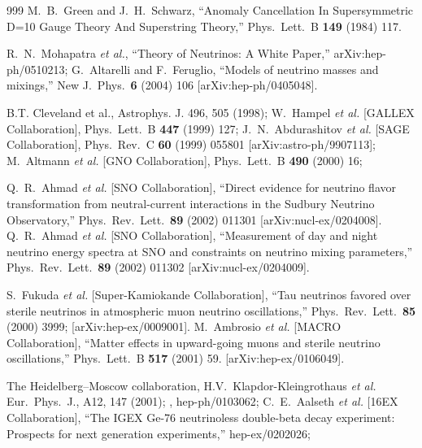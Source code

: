 \begin{thebibliography}{999}
  M.~B.~Green and J.~H.~Schwarz,
  ``Anomaly Cancellation In Supersymmetric D=10 Gauge Theory And Superstring
  Theory,''
  Phys.\ Lett.\ B {\bf 149} (1984) 117.

R.~N.~Mohapatra {\it et al.},
  ``Theory of Neutrinos: A White Paper,''
  arXiv:hep-ph/0510213;
G.~Altarelli and F.~Feruglio,
  ``Models of neutrino masses and mixings,''
  New J.\ Phys.\  {\bf 6} (2004) 106
  [arXiv:hep-ph/0405048].

B.T. Cleveland et al., Astrophys. J. 496, 505 (1998);
W.~Hampel {\it et al.}  [GALLEX Collaboration],
  Phys.\ Lett.\ B {\bf 447} (1999) 127;
J.~N.~Abdurashitov {\it et al.}  [SAGE Collaboration],
  Phys.\ Rev.\ C {\bf 60} (1999) 055801
  [arXiv:astro-ph/9907113];
M.~Altmann {\it et al.}  [GNO Collaboration],
  Phys.\ Lett.\ B {\bf 490} (2000) 16;

Q.~R.~Ahmad {\it et al.}  [SNO Collaboration],
``Direct evidence for neutrino flavor transformation from neutral-current
interactions in the Sudbury Neutrino Observatory,''
Phys.\ Rev.\ Lett.\  {\bf 89} (2002) 011301
[arXiv:nucl-ex/0204008].
Q.~R.~Ahmad {\it et al.}  [SNO Collaboration],
``Measurement of day and night neutrino energy spectra at SNO and constraints
on neutrino mixing parameters,''
Phys.\ Rev.\ Lett.\  {\bf 89} (2002) 011302
[arXiv:nucl-ex/0204009].

S.~Fukuda {\it et al.}  [Super-Kamiokande Collaboration],
  ``Tau neutrinos favored over sterile neutrinos in atmospheric muon  neutrino
  oscillations,''
  Phys.\ Rev.\ Lett.\  {\bf 85} (2000) 3999;
  [arXiv:hep-ex/0009001].
 M.~Ambrosio {\it et al.}  [MACRO Collaboration],
  ``Matter effects in upward-going muons and sterile neutrino oscillations,''
  Phys.\ Lett.\ B {\bf 517} (2001) 59.
  [arXiv:hep-ex/0106049].

The {\sc Heidelberg--Moscow} collaboration,
H.V.~Klap\-dor-Klein\-grot\-haus {\it et al.} Eur.\ Phys.\ J., A12, 147 (2001);
, hep-ph/0103062;
C.~E.~Aalseth {\it et al.}  [16EX Collaboration],
``The IGEX Ge-76 neutrinoless double-beta decay experiment: Prospects for  next generation experiments,''
hep-ex/0202026;


\end{thebibliography}
